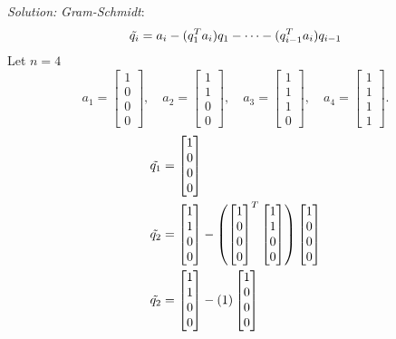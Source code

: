 \documentclass{article}
\newenvironment{solution}
    {\textit{Solution:}}
    {}
\begin{document}
\begin{solution}
\textit{Gram-Schmidt}:
$$\Tilde{q_i}=a_i - (q_1^T a_i)q_1 - \cdots - (q_{i-1}^Ta_i)q_{i-1}$$
Let $n=4$ 
$$a_1 = \begin{bmatrix}1\\ 0\\ 0\\ 0\end{bmatrix}, \quad 
a_2 = \begin{bmatrix}1\\ 1\\ 0\\ 0\end{bmatrix}, \quad 
a_3 = \begin{bmatrix}1\\ 1\\ 1\\ 0\end{bmatrix}, \quad
a_4 = \begin{bmatrix}1\\ 1\\ 1\\ 1\end{bmatrix}.$$
\begin{align*}
    \Tilde{q_1} &= \begin{bmatrix}1\\ 0\\ 0\\ 0\end{bmatrix} \\
    \Tilde{q_2} &= \begin{bmatrix}1\\ 1\\ 0\\ 0\end{bmatrix} - \left( \begin{bmatrix}1\\ 0\\ 0\\
    0\end{bmatrix}^T \begin{bmatrix}1\\ 1\\ 0\\ 0\end{bmatrix}\right) \begin{bmatrix}1\\ 0\\ 0\\
    0\end{bmatrix}\\
    \Tilde{q_2} &= \begin{bmatrix}1\\ 1\\ 0\\ 0\end{bmatrix} - \left( 1\right) \begin{bmatrix}1\\ 0\\ 0\\ 0\end{bmatrix} \\

\end{align*}
\end{solution}
\end{document}
